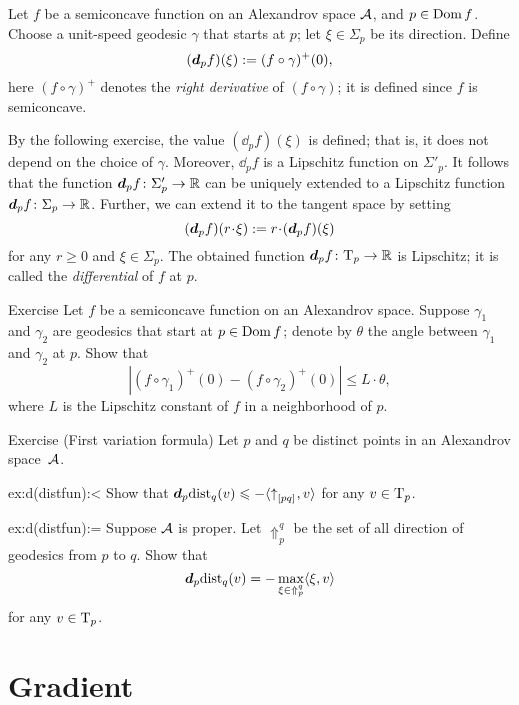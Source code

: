 Let $f$ be a semiconcave function on an Alexandrov space $\mathcal{A}$, and $p\in \mathop{\rm Dom}\nolimits f$.
Choose a unit-speed geodesic $\gamma$ that starts at $p$;
let $\xi\in\Sigma_p$ be its direction.
Define 
\[(\bm{d}_pf)(\xi)\mathrel{:=}(f\circ\gamma)^+(0),\]
here $(f\circ\gamma)^+$ denotes the \emph{right derivative} of $(f\circ\gamma)$;
it is defined since $f$ is semiconcave.

By the following exercise, the value $(\dd_pf)(\xi)$ is defined; that is, it does not depend on the choice of $\gamma$.
Moreover, $\dd_pf$ is a Lipschitz function on $\Sigma'_p$.
It follows that the function $\bm{d}_pf\colon\Sigma_p'\to\mathbb{R}$ can be uniquely extended to a Lipschitz function $\bm{d}_pf\colon\Sigma_p\to\mathbb{R}$.
Further, we can extend it to the tangent space by setting 
\[(\dd_pf)(r\cdot \xi)
\df
r\cdot (\dd_pf)(\xi)\]
for any $r\ge 0$ and $\xi\in\Sigma_p$.
The obtained function $\bm{d}_pf\colon\mathrm{T}_p\to\mathbb{R}$ is Lipschitz;
it is called the \emph{differential} of $f$ at $p$.

\begin{thm}{Exercise}\label{ex:df(xi)}
Let $f$ be a semiconcave function on an Alexandrov space.
Suppose $\gamma_1$ and $\gamma_2$ are geodesics that start at $p\in \mathop{\rm Dom}\nolimits f$;
denote by $\theta$ the angle between $\gamma_1$ and $\gamma_2$ at $p$.
Show that 
\[|(f\circ\gamma_1)^+(0)-(f\circ\gamma_2)^+(0)|\le L\cdot \theta,\]
where $L$ is the Lipschitz constant of $f$ in a neighborhood of $p$.
\end{thm}

\begin{thm}{Exercise (First variation formula)} \label{ex:d(distfun)}
Let $p$ and $q$ be distinct points in an Alexandrov space~$\mathcal{A}$.

\begin{subthm}{ex:d(distfun):<}
Show that
$\bm{d}_p\mathrm{dist}_q(v)\leqslant -\langle{\uparrow}_{[{p}{q}]_{{}}},v\rangle$
for any $v\in\mathrm{T}_p$.
\end{subthm}

\begin{subthm}{ex:d(distfun):=}
Suppose $\mathcal{A}$ is proper.
Let $\Uparrow_p^q$ be the set of all direction of  geodesics from $p$ to $q$.
Show that
\[\bm{d}_p\mathrm{dist}_q(v)=-\max_{\xi\in\Uparrow_p^q}\langle\xi,v\rangle\]
for any $v\in\mathrm{T}_p$.
\end{subthm}

\end{thm}

\section{Gradient}\label{sec:grad-def}

